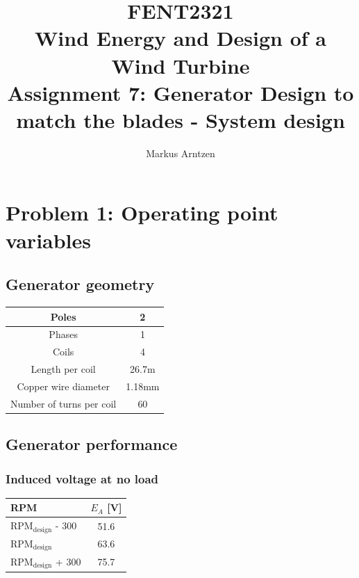 \documentclass[11pt,a4paper]{article}
\title{
    \textbf{FENT2321}\\[0.3cm]
    Wind Energy and Design of a Wind Turbine\\[0.5cm]
    \Large Assignment 7: Generator Design to match the blades - System design}
\author{Markus Arntzen}
\date{}
\begin{document}
\maketitle
\thispagestyle{empty}

\clearpage
\tableofcontents
\clearpage


\section{Problem 1: Operating point variables}

\subsection{Generator geometry}

\begin{center}
    \renewcommand{\arraystretch}{1.5}
    \setlength{\tabcolsep}{10pt}
    \begin{tabular}{|c|c|}
        \hline
        Poles & 2 \\
        \hline
        Phases & 1 \\
        \hline
        Coils & 4 \\
        \hline
        Length per coil & 26.7m \\
        \hline
        Copper wire diameter & 1.18mm \\
        \hline
        Number of turns per coil & 60 \\
        \hline
    \end{tabular}
\end{center}
    
\subsection{Generator performance}
\subsubsection{Induced voltage at no load}

\begin{center}
    \renewcommand{\arraystretch}{1.5}
    \setlength{\tabcolsep}{10pt}
    \begin{tabular}{|l|c|}
        \hline
        \textbf{RPM} & \textbf{$E_A$ [V]} \\
        \hline
        RPM$_\text{design}$ - 300 & 51.6 \\
        \hline
        RPM$_\text{design}$ & 63.6 \\
        \hline
        RPM$_\text{design}$ + 300 & 75.7 \\
        \hline
    \end{tabular}
\end{center}
\end{document}
